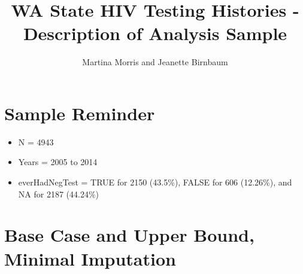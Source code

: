\documentclass{article}\usepackage[]{graphicx}\usepackage[]{color}
\begin{document}
\title{WA State HIV Testing Histories - Description of Analysis Sample}
\author{Martina Morris and Jeanette Birnbaum}
\maketitle

\section{Sample Reminder}

\begin{itemize}
    \item N = 4943
    \item Years = 2005 to 2014
    \item everHadNegTest = TRUE for 2150 (43.5\%), FALSE for 606 (12.26\%), and NA for 2187 (44.24\%)
\end{itemize}








\section{Base Case and Upper Bound, Minimal Imputation}
\end{document}
